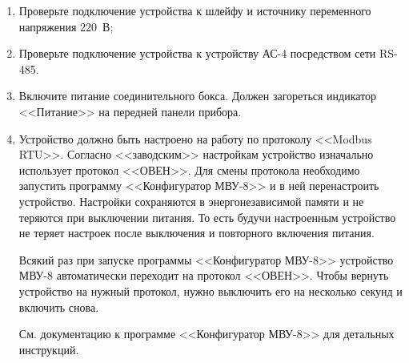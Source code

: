 \begin{enumerate}

\item Проверьте подключение устройства к шлейфу и источнику переменного напряжения 220~В;

\item Проверьте подключение устройства к устройству АС-4 посредством сети RS-485.

\item Включите питание соединительного бокса. Должен загореться индикатор <<Питание>> на передней панели прибора.

\item Устройство должно быть настроено на работу по протоколу <<Modbus RTU>>. Согласно <<заводским>> настройкам устройство изначально использует протокол <<ОВЕН>>. Для смены протокола необходимо запустить программу <<Конфигуратор МВУ-8>> и в ней перенастроить устройство. Настройки сохраняются в энергонезависимой памяти и не теряются при выключении питания. То есть будучи настроенным устройство не теряет настроек после выключения и повторного включения питания.

\IMPORTANT Всякий раз при запуске программы <<Конфигуратор МВУ-8>> устройство МВУ-8 автоматически переходит на протокол <<ОВЕН>>. Чтобы вернуть устройство на нужный протокол, нужно выключить его на несколько секунд и включить снова.

См. документацию к программе <<Конфигуратор МВУ-8>> для детальных инструкций.

\end{enumerate}
